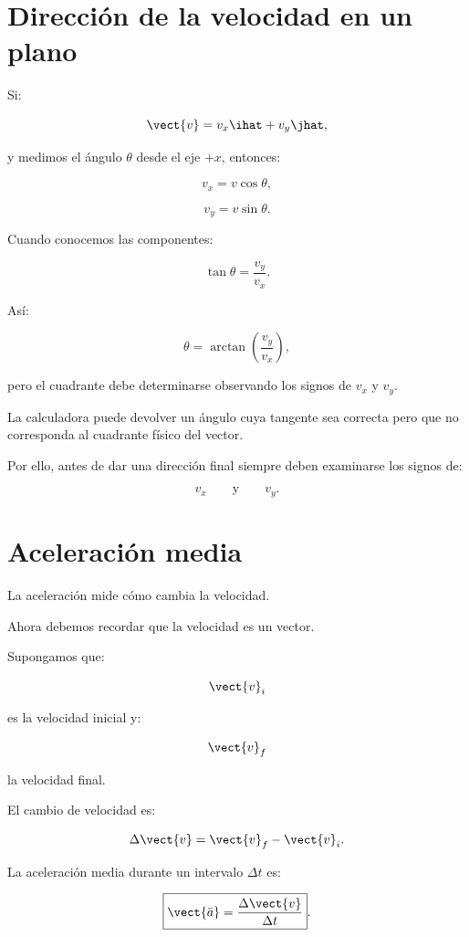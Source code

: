\section{Dirección de la velocidad en un plano}

Si:

\[
\vect{v}
=
v_x\ihat+v_y\jhat,
\]

y medimos el ángulo \(\theta\) desde el eje \(+x\), entonces:

\[
v_x=v\cos\theta,
\]

\[
v_y=v\sin\theta.
\]

Cuando conocemos las componentes:

\[
\tan\theta=\frac{v_y}{v_x}.
\]

Así:

\[
\theta
=
\arctan\left(\frac{v_y}{v_x}\right),
\]

pero el cuadrante debe determinarse observando los signos de \(v_x\) y \(v_y\).

\begin{errorfrecuente}[El cuadrante]
La calculadora puede devolver un ángulo cuya tangente sea correcta pero que no
corresponda al cuadrante físico del vector.

Por ello, antes de dar una dirección final siempre deben examinarse los signos de:

\[
v_x
\qquad\text{y}\qquad
v_y.
\]
\end{errorfrecuente}


\section{Aceleración media}

La aceleración mide cómo cambia la velocidad.

Ahora debemos recordar que la velocidad es un vector.

Supongamos que:

\[
\vect{v}_i
\]

es la velocidad inicial y:

\[
\vect{v}_f
\]

la velocidad final.

El cambio de velocidad es:

\[
\Delta\vect{v}
=
\vect{v}_f-\vect{v}_i.
\]

\begin{definicion}
La aceleración media durante un intervalo \(\Delta t\) es:

\[
\boxed{
\vect{\bar{a}}
=
\frac{\Delta\vect{v}}{\Delta t}
}.
\]
\end{definicion}

